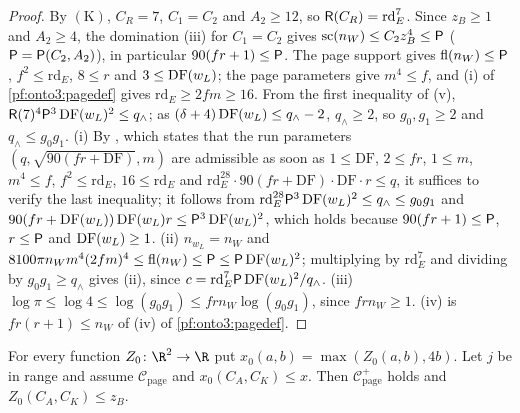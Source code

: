 \begin{proof}
By $(\mathrm K)$, $C_R=7$, $C_1=C_2$ and $A_2\ge12$, so $\mathsf{R}(C_R)=\mathrm{rd}_E^7$. Since $z_B\ge1$ and $A_2\ge4$, the
domination (iii) for $C_1=C_2$ gives $\mathrm{sc}(n_W)\le C_2z_B^4\le\mathsf{P}$ ($\mathsf{P}=\mathsf{P}(C_2,A_2)$), in
particular $90(fr+1)\le\mathsf{P}$. The page support gives $\mathrm{fl}(n_W)\le\mathsf{P}$, $f^2\le\mathrm{rd}_E$, $8\le r$
and $3\le\operatorname{DF}(w_L)$; the page parameters give $m^4\le f$, and (i) of \cref{pf:onto3:pagedef} gives
$\mathrm{rd}_E\ge2fm\ge16$. From the first inequality of (v), $\mathsf{R}(7)^4\mathsf{P}^3\operatorname{DF}(w_L)^2\le q_\wedge$;
as $(\delta+4)\operatorname{DF}(w_L)\le q_\wedge-2$, $q_\wedge\ge2$, so $g_0,g_1\ge2$ and $q_\wedge\le g_0g_1$.
(i) By , which states that the run parameters
$(q,\sqrt{90(fr+\mathrm{DF})},m)$ are admissible as soon as $1\le\mathrm{DF}$, $2\le fr$, $1\le m$, $m^4\le f$, $f^2\le
\mathrm{rd}_E$, $16\le\mathrm{rd}_E$ and $\mathrm{rd}_E^{28}\cdot90(fr+\mathrm{DF})\cdot\mathrm{DF}\cdot r\le q$, it suffices to verify
the last inequality; it follows from $\mathrm{rd}_E^{28}\mathsf{P}^3\operatorname{DF}(w_L)^2\le q_\wedge\le g_0g_1$ and
$90(fr+\operatorname{DF}(w_L))\operatorname{DF}(w_L)r\le\mathsf{P}^3\operatorname{DF}(w_L)^2$, which holds because $90(fr+1)\le
\mathsf{P}$, $r\le\mathsf{P}$ and $\operatorname{DF}(w_L)\ge1$.
(ii) $n_{w_L}=n_W$ and $8100\pi n_Wm^4(2fm)^4\le\mathrm{fl}(n_W)\le\mathsf{P}\le\mathsf{P}\operatorname{DF}(w_L)^2$; multiplying
by $\mathrm{rd}_E^7$ and dividing by $g_0g_1\ge q_\wedge$ gives (ii), since $c=\mathrm{rd}_E^7\mathsf{P}\operatorname{DF}(w_L)^2/
q_\wedge$.
(iii) $\log\pi\le\log4\le\log(g_0g_1)\le frn_W\log(g_0g_1)$, since $frn_W\ge1$. (iv) is $fr(r+1)\le n_W$ of (iv) of
\cref{pf:onto3:pagedef}.
\end{proof}

\begin{lemma}\label{pf:onto3:pageok}
For every function $Z_0\colon\R^2\to\R$ put $x_0(a,b)=\max(Z_0(a,b),4b)$. Let $j$ be in range and assume
$\mathcal C_{\mathrm{page}}$ and $x_0(C_A,C_K)\le x$. Then $\mathcal C^+_{\mathrm{page}}$ holds and $Z_0(C_A,C_K)\le z_B$.
\end{lemma}

